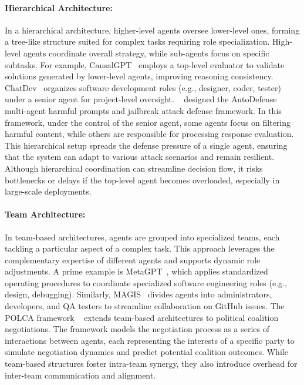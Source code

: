 \paragraph{Hierarchical Architecture:}In a hierarchical architecture, higher-level agents oversee lower-level ones, forming a tree-like structure suited for complex tasks requiring role specialization. High-level agents coordinate overall strategy, while sub-agents focus on specific subtasks. For example, CausalGPT~\cite{casualgpt_reasoning} employs a top-level evaluator to validate solutions generated by lower-level agents, improving reasoning consistency. ChatDev~\cite{chatdev_software_development} organizes software development roles (e.g., designer, coder, tester) under a senior agent for project-level oversight. ~\cite{autodefense_against_jailbreak} designed the AutoDefense multi-agent harmful prompts and jailbreak attack defense framework. In this framework, under the control of the senior agent, some agents focus on filtering harmful content, while others are responsible for processing response evaluation. This hierarchical setup spreads the defense pressure of a single agent, ensuring that the system can adapt to various attack scenarios and remain resilient. Although hierarchical coordination can streamline decision flow, it risks bottlenecks or delays if the top-level agent becomes overloaded, especially in large-scale deployments.

\paragraph{Team Architecture:}In team-based architectures, agents are grouped into specialized teams, each tackling a particular aspect of a complex task. This approach leverages the complementary expertise of different agents and supports dynamic role adjustments. A prime example is MetaGPT~\cite{metagpt}, which applies standardized operating procedures to coordinate specialized software engineering roles (e.g., design, debugging). Similarly, MAGIS~\cite{magis_mas_for_github} divides agents into administrators, developers, and QA testers to streamline collaboration on GitHub issues. The POLCA framework ~\cite{polca_mas_for_political} extends team-based architectures to political coalition negotiations. The framework models the negotiation process as a series of interactions between agents, each representing the interests of a specific party to simulate negotiation dynamics and predict potential coalition outcomes. While team-based structures foster intra-team synergy, they also introduce overhead for inter-team communication and alignment.


